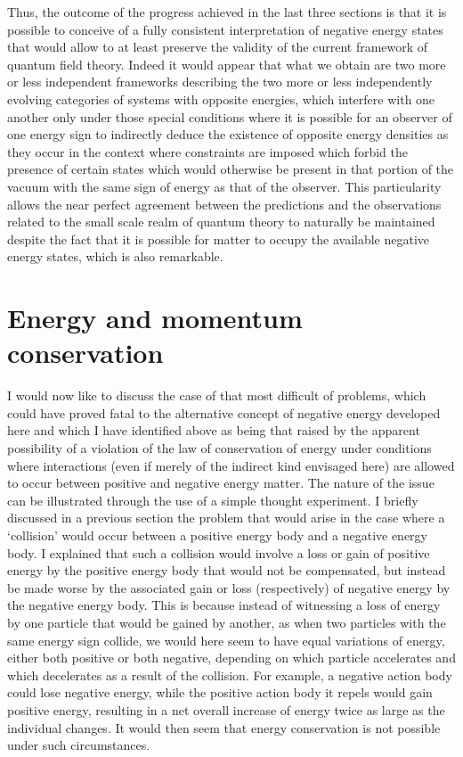 \documentclass[notitlepage,12pt]{report}
\begin{document}
Thus, the outcome of the progress achieved in the last three sections is that it is possible to conceive of a fully consistent interpretation of negative energy states that would allow to at least preserve the validity of the current framework of quantum field theory. Indeed it would appear that what we obtain are two more or less independent frameworks describing the two more or less independently evolving categories of systems with opposite energies, which interfere with one another only under those special conditions where it is possible for an observer of one energy sign to indirectly deduce the existence of opposite energy densities as they occur in the context where constraints are imposed which forbid the presence of certain states which would otherwise be present in that portion of the vacuum with the same sign of energy as that of the observer. This particularity allows the near perfect agreement between the predictions and the observations related to the small scale realm of quantum theory to naturally be maintained despite the fact that it is possible for matter to occupy the available negative energy states, which is also remarkable.

\section{Energy and momentum conservation}

I would now like to discuss the case of that most difficult of problems, which could have proved fatal to the alternative concept of negative energy developed here and which I have identified above as being that raised by the apparent possibility of a violation of the law of conservation of energy under conditions where interactions (even if merely of the indirect kind envisaged here) are allowed to occur between positive and negative energy matter. The nature of the issue can be illustrated through the use of a simple thought experiment. I briefly discussed in a previous section the problem that would arise in the case where a `collision' would occur between a positive energy body and a negative energy body. I explained that such a collision would involve a loss or gain of positive energy by the positive energy body that would not be compensated, but instead be made worse by the associated gain or loss (respectively) of negative energy by the negative energy body. This is because instead of witnessing a loss of energy by one particle that would be gained by another, as when two particles with the same energy sign collide, we would here seem to have equal variations of energy, either both positive or both negative, depending on which particle accelerates and which decelerates as a result of the collision. For example, a negative action body could lose negative energy, while the positive action body it repels would gain positive energy, resulting in a net overall increase of energy twice as large as the individual changes. It would then seem that energy conservation is not possible under such circumstances.
\end{document}
